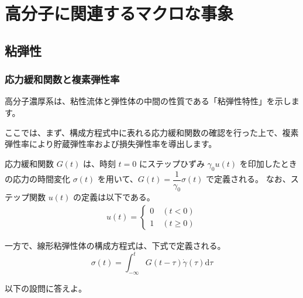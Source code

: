 \documentclass[uplatex,dvipdfmx,a4paper,11pt]{jsarticle}
\newcommand{\diff}{\mathrm d}
\begin{document}
\newpage

\section{高分子に関連するマクロな事象}

\subsection{粘弾性}

\subsubsection{応力緩和関数と複素弾性率}

\begin{boxnote}

高分子濃厚系は、粘性流体と弾性体の中間の性質である「粘弾性特性」を示します。

ここでは、まず、構成方程式中に表れる応力緩和関数の確認を行った上で、複素弾性率により貯蔵弾性率および損失弾性率を導出します。


%
%
%
%

\end{boxnote}

\vspace{10pt}

応力緩和関数 $G(t)$ は、時刻 $t=0$ にステップひずみ $\gamma_0 u(t)$ を印加したときの応力の時間変化 $\sigma(t)$ を用いて、$G(t) = \dfrac{1}{\gamma_0} \sigma(t)$ で定義される。
なお、ステップ関数 $u(t)$ の定義は以下である。
\begin{align*}
u(t) =
\begin{cases}
0 \quad (t < 0) \\
1 \quad (t \geq 0)
\end{cases}
\end{align*}


一方で、線形粘弾性体の構成方程式は、下式で定義される。
\begin{equation*}
\sigma(t)=\int_{-\infty}^{t} G(t-\tau)\dot{\gamma}(\tau) \diff \tau
\end{equation*}

以下の設問に答えよ。
\end{document}
